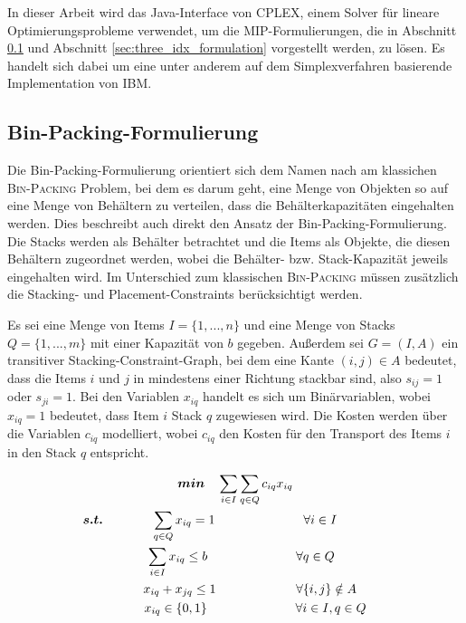 In dieser Arbeit wird das Java-Interface von CPLEX, einem Solver für lineare Optimierungsprobleme verwendet,
um die MIP-Formulierungen, die in Abschnitt \ref{sec:bin_packing_formulation} und Abschnitt \ref{sec:three_idx_formulation} vorgestellt werden,
zu lösen. Es handelt sich dabei um eine unter anderem auf dem Simplexverfahren basierende Implementation von IBM. \cite{CPLEX2015}

\subsection{Bin-Packing-Formulierung}
\label{sec:bin_packing_formulation}

Die Bin-Packing-Formulierung orientiert sich dem Namen nach am klassichen \textsc{Bin-Packing} Problem, bei dem es darum geht,
eine Menge von Objekten so auf eine Menge von Behältern zu verteilen, dass die Behälterkapazitäten eingehalten werden.
Dies beschreibt auch direkt den Ansatz der Bin-Packing-Formulierung. Die Stacks werden als Behälter betrachtet und die Items als Objekte,
die diesen Behältern zugeordnet werden, wobei die Behälter- bzw. Stack-Kapazität jeweils eingehalten wird. Im Unterschied zum klassischen \textsc{Bin-Packing} müssen zusätzlich die Stacking- und Placement-Constraints berücksichtigt werden.

Es sei eine Menge von Items $I = \{1, ..., n\}$ und eine Menge von Stacks $Q = \{1, ..., m\}$ mit einer Kapazität von $b$ gegeben.
Außerdem sei $G = (I, A)$ ein transitiver Stacking-Constraint-Graph, bei dem eine Kante $(i, j) \in A$ bedeutet,
dass die Items $i$ und $j$ in mindestens einer Richtung stackbar sind, also $s_{ij} = 1$ oder $s_{ji} = 1$.\newline
Bei den Variablen $x_{iq}$ handelt es sich um Binärvariablen, wobei $x_{iq} = 1$ bedeutet, dass Item $i$ Stack $q$ zugewiesen wird.
Die Kosten werden über die Variablen $c_{iq}$ modelliert, wobei $c_{iq}$ den Kosten für den Transport des Items $i$ in den Stack $q$
entspricht.

\begin{gather}
\boldsymbol{min} \quad \sum_{i \in I} \sum_{q \in Q} c_{iq} x_{iq} \label{bin_packing_line_one} \\
\thinspace\thinspace \boldsymbol{s.t.} \thinspace\quad\thinspace\thinspace\thinspace\quad\thinspace \quad \sum_{q \in Q} x_{iq} = 1 \quad\quad\quad\quad\quad\quad\quad \forall i \in I \quad\quad\quad\quad\thinspace\thinspace \label{bin_packing_line_two} \\
\quad \sum_{i \in I} x_{iq} \leq b \quad\quad\quad\quad\quad\quad\quad \forall q \in Q \label{bin_packing_line_three} \\
\thinspace\thinspace\quad\quad x_{iq} + x_{jq} \leq 1 \quad\quad\thinspace\thinspace\quad\quad\quad\quad \forall \{i, j\} \notin A \label{bin_packing_line_four} \\
\thinspace\thinspace\quad\quad\quad x_{iq} \in \{0, 1\} \thinspace\thinspace\thinspace\thinspace\thinspace\thinspace\quad\quad\quad\quad\quad\quad \forall i \in I, q \in Q \thinspace \label{bin_packing_line_five}
\end{gather}

